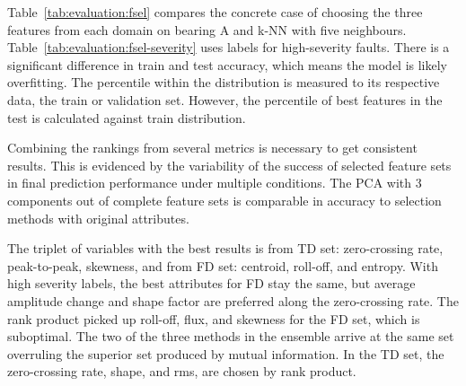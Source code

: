 Table~\ref{tab:evaluation:fsel} compares the concrete case of choosing the three features from each domain on bearing A and k-NN with five neighbours. Table~\ref{tab:evaluation:fsel-severity} uses labels for high-severity faults. There is a significant difference in train and test accuracy, which means the model is likely overfitting. The percentile within the distribution is measured to its respective data, the train or validation set. However, the percentile of best features in the test is calculated against train distribution.

Combining the rankings from several metrics is necessary to get consistent results. This is evidenced by the variability of the success of selected feature sets in final prediction performance under multiple conditions. The PCA with 3 components out of complete feature sets is comparable in accuracy to selection methods with original attributes.

The triplet of variables with the best results is from TD set: zero-crossing rate, peak-to-peak, skewness, and from FD set: centroid, roll-off, and entropy. With high severity labels, the best attributes for FD stay the same, but average amplitude change and shape factor are preferred along the zero-crossing rate. The rank product picked up roll-off, flux, and skewness for the FD set, which is suboptimal. The two of the three methods in the ensemble arrive at the same set overruling the superior set produced by mutual information. In the TD set, the zero-crossing rate, shape, and rms, are chosen by rank product. 

